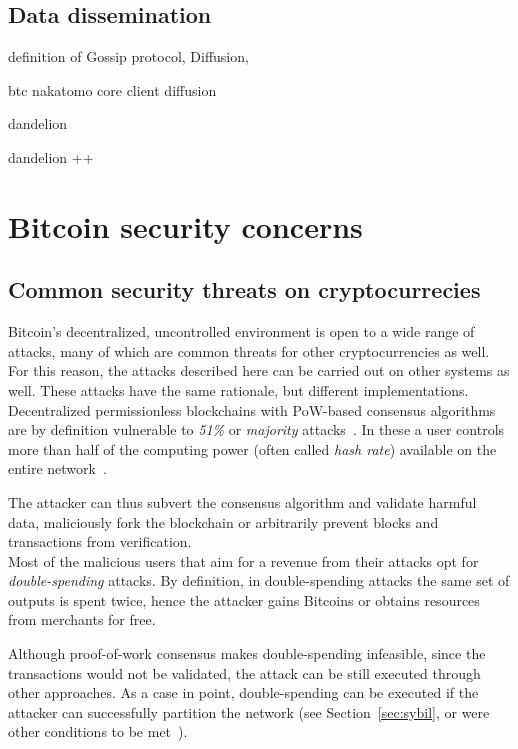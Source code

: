 \documentclass[12pt, letterpaper, twoside]{article}
\begin{document}
\subsection{Data dissemination}\label{sec:dissem}
definition of Gossip protocol, Diffusion,

btc nakatomo core client diffusion

dandelion

dandelion ++




\section{Bitcoin security concerns}\label{sec:securityintro}
\subsection{Common security threats on cryptocurrecies}
Bitcoin's decentralized, uncontrolled environment is open to a wide range of attacks, many of which are common threats for other cryptocurrencies as well. For this reason, the attacks described here can be carried out on other systems as well. These attacks have the same rationale, but different implementations.\\

Decentralized permissionless blockchains with PoW-based consensus algorithms are by definition vulnerable to \textit{51\%} or \textit{majority} attacks~\cite{nakamoto}. In these a user controls more than half of the computing power (often called \textit{hash rate}) available on the entire network~\cite{51atk}.

The attacker can thus subvert the consensus algorithm and validate harmful data, maliciously fork the blockchain or arbitrarily prevent blocks and transactions from verification.\\

Most of the malicious users that aim for a revenue from their attacks opt for \textit{double-spending} attacks. By definition, in double-spending attacks the same set of outputs is spent twice, hence the attacker gains Bitcoins or obtains resources from merchants for free.

Although proof-of-work consensus makes double-spending infeasible, since the transactions would not be validated, the attack can be still executed through other approaches. As a case in point, double-spending can be executed  if the attacker can successfully partition the network (see Section~\ref{sec:sybil}, or were other conditions to be met~\cite{doublespendfastpay}).\\
\end{document}
